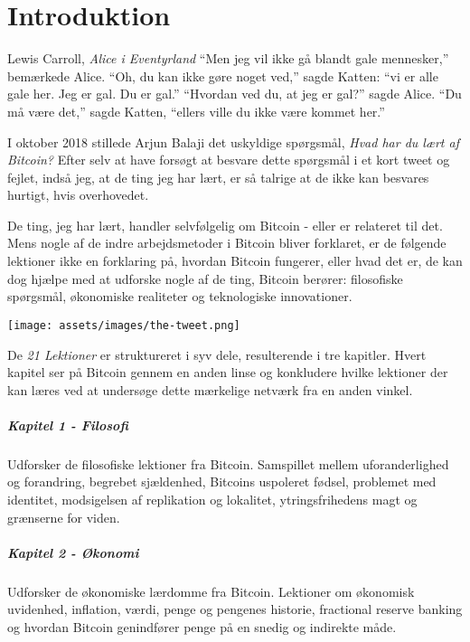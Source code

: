 \chapter*{Introduktion}
\label{ch:introduktion}

\begin{chapquote}{Lewis Carroll, \textit{Alice i Eventyrland}}
\enquote{Men jeg vil ikke gå blandt gale mennesker,} bemærkede Alice. 
\enquote{Oh, du kan ikke gøre noget ved,} sagde Katten: \enquote{vi er alle gale 
her. Jeg er gal. Du er gal.} \enquote{Hvordan ved du, at jeg er gal?} sagde 
Alice. \enquote{Du må være det,} sagde Katten, \enquote{ellers ville du ikke
være kommet her.} \end{chapquote}

I oktober 2018 stillede Arjun Balaji det uskyldige spørgsmål,
\textit{Hvad har du lært af Bitcoin?} Efter selv at have forsøgt at besvare 
dette spørgsmål i et kort tweet og fejlet, indså jeg, at de ting jeg har lært, 
er så talrige at de ikke kan besvares hurtigt, hvis overhovedet.

De ting, jeg har lært, handler selvfølgelig om Bitcoin - eller er relateret 
til det. Mens nogle af de indre arbejdsmetoder i Bitcoin 
bliver forklaret, er de følgende lektioner ikke en forklaring på, hvordan 
Bitcoin fungerer, eller hvad det er, de kan dog hjælpe med at udforske nogle 
af de ting, Bitcoin berører: filosofiske spørgsmål, økonomiske realiteter og 
teknologiske innovationer.

\begin{center}
  \texttt{[image: assets/images/the-tweet.png]}
\end{center}

De \textit{21 Lektioner} er struktureret i syv dele, resulterende i tre
kapitler. Hvert kapitel ser på Bitcoin gennem en anden linse og konkludere
hvilke lektioner der kan læres ved at undersøge dette mærkelige netværk fra en 
anden vinkel.

\paragraph{Kapitel 1 - Filosofi} 
Udforsker de filosofiske lektioner fra Bitcoin. Samspillet mellem 
uforanderlighed og forandring, begrebet sjældenhed, Bitcoins uspoleret fødsel, 
problemet med identitet, modsigelsen af replikation og lokalitet, 
ytringsfrihedens magt og grænserne for viden.

\paragraph{Kapitel 2 - Økonomi} 
Udforsker de økonomiske lærdomme fra Bitcoin. Lektioner om økonomisk uvidenhed, 
inflation, værdi, penge og pengenes historie, fractional reserve banking og 
hvordan Bitcoin genindfører penge på en snedig og indirekte måde.

